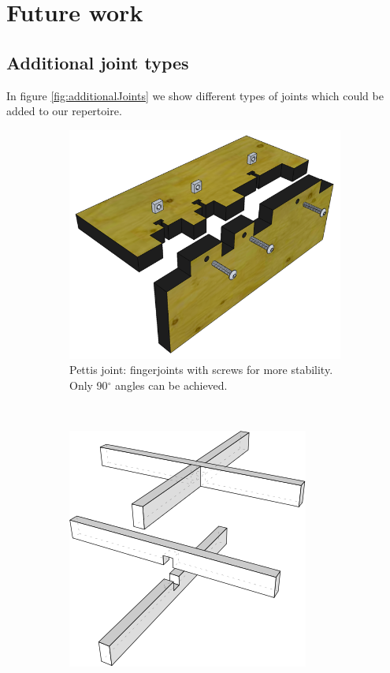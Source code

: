 \documentclass[../ClassicThesis.tex]{subfiles}
\begin{document}
\section{Future work}\label{futureWork}
\subsection{Additional joint types}
In figure \ref{fig:additionalJoints} we show different types of joints which could be added to our repertoire.
\begin{figure}
    \centering
\begin{subfigure}[b]{0.45\textwidth}
    \includegraphics[width=\textwidth]{Images/pettis-joints.png}
    \caption{Pettis joint: fingerjoints with screws for more stability. Only 90$^\circ$ angles can be achieved.}
    \end{subfigure}
    ~
    \begin{subfigure}[b]{0.45\textwidth}
    \includegraphics[width=\textwidth]{Images/HalvedJoint.png}

\end{subfigure}
\end{figure}
\end{document}
